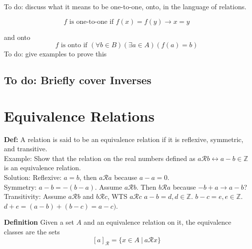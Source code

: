 \documentclass{article}
\begin{document}
    To do:  discuss what it means to be one-to-one, onto, in the language of relations.
    
    
    $$f\text{ is one-to-one if } f(x) = f(y) \rightarrow x = y$$
    
    and onto
    $$f\text{ is onto if } (\forall b\in B)(\exists a\in A) (f(a)=b)$$
    To do: give examples to prove this

\subsection*{To do: Briefly cover Inverses}

\section{Equivalence Relations}
    
    {\bf Def:} A relation is said to be an equivalence relation if it is reflexive, symmetric, and transitive. \\
    
    Example: Show that the relation on the real numbers defined as $a\mathcal{R}b \leftrightarrow a-b\in \mathbb{Z}$ is an equivalence relation.\\
    
    \vspace{1.5mm}
    Solution: 
    Reflexive: $a = b$, then $a \mathcal{R} a$ because $a - a = 0$. \\
    Symmetry: $a - b = -(b - a)$. Assume $a \mathcal{R} b$. Then $b \mathcal{R} a$ because $-b + a \rightarrow a - b$? \\
    Transitivity: Assume $a \mathcal{R} b$ and $b \mathcal{R} c$, WTS $a \mathcal{R} c$ $a - b = d, d \in \mathbb{Z}$. $b - c = e, e \in \mathbb{Z}$. $d + e = (a - b) + (b - c) = a- c)$.
    
    \textbf{Definition}
    Given a set $A$ and an equivalence relation on it, the equivalence classes are the sets
    $$[a]_{\mathcal{R}}=\{x\in A~|~a\mathcal{R} x\}$$
    
\end{document}
